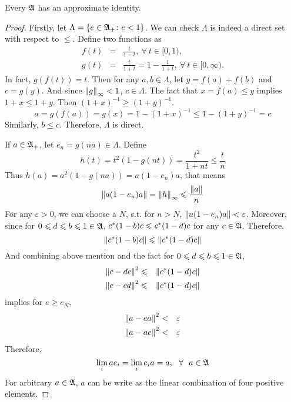 \documentclass[a4paper,11pt]{report}
\begin{document}
\begin{thm}
	Every \Cs $\mathfrak{A}$ has an approximate identity.
\end{thm}
\begin{proof}
	Firstly, let $\Lambda = \{e \in \mathfrak{A}_{+} \colon e < 1\}$. We can check $\Lambda$ is indeed a direct set with respect to $\leqslant$. Define two functions as
	\begin{eqnarray*}
		f(t) &=& \frac{t}{1-t},~ \forall~ t \in [0,1),\\
		g(t) &=& \frac{t}{1+t} = 1 - \frac{1}{1+t},~ \forall~ t \in [0,\infty).
	\end{eqnarray*}
	In fact, $g(f(t))=t$. Then for any $a,b \in \Lambda$, let $y=f(a)+f(b)$ and $c = g(y)$. And since $\left\lVert g\right\lVert_{\infty} < 1$, $c \in \Lambda$. The fact that $x=f(a) \leqslant y$ implies $1+x \leqslant 1+y$. Then $(1+x)^{-1} \geqslant (1+y)^{-1}$.
	\begin{equation*}
		a = g(f(a)) = g(x) = 1 - (1+x)^{-1} \leqslant 1-(1+y)^{-1} =c
	\end{equation*}
	Similarly, $b \leqslant c$. Therefore, $\Lambda$ is direct.
	\item If $a \in \mathfrak{A}_{+}$, let $e_n=g(na) \in \Lambda$. Define
	\begin{equation*}
		h(t) = t^2(1-g(nt)) = \frac{t^2}{1+nt} \leqslant \frac{t}{n}
	\end{equation*}
	Thus $h(a)= a^2(1-g(na)) = a(1-e_n)a$, that means
	\begin{equation*}
		\left\lVert a(1-e_n)a\right\lVert = \left\lVert h\right\lVert_{\infty} \leqslant \frac{\left\lVert a\right\lVert}{n}
	\end{equation*}
	For any $\varepsilon > 0$, we can choose a $N$, s.t. for $n > N$, $\left\lVert a(1-e_n)a\right\lVert < \varepsilon$. Moreover, since for $0 \leqslant d \leqslant b \leqslant 1 \in \mathfrak{A}$, $c^{*}(1-b)c \leqslant c^{*}(1-d)c$ for any $c \in \mathfrak{A}$. Therefore, 
	\begin{equation*}
		\left\lVert c^{*}(1-b)c\right\lVert \leqslant \left\lVert c^{*}(1-d)c\right\lVert
	\end{equation*}
	And combining above mention and the fact for $0 \leqslant d \leqslant b \leqslant 1 \in \mathfrak{A}$,
	\begin{eqnarray*}
		\left\lVert c-dc\right\lVert^2 &\leqslant& \left\lVert c^{*}(1-d)c\right\lVert \\
		\left\lVert c-cd\right\lVert^2 &\leqslant& \left\lVert c^{*}(1-d)c\right\lVert
	\end{eqnarray*}
	implies for $e \geqslant e_N$, 
	\begin{eqnarray*}
		\left\lVert a-ea\right\lVert^2 &<& \varepsilon \\
		\left\lVert a-ae\right\lVert^2 &<& \varepsilon
	\end{eqnarray*}
	Therefore, 
	\begin{equation*}
		\lim_{i} ae_i = \lim_{i} e_ia = a,~~\forall~~a \in \mathfrak{A} 
	\end{equation*}
	For arbitrary $a \in \mathfrak{A}$, $a$ can be write as the linear combination of four positive elements.
\end{proof}
\end{document}
